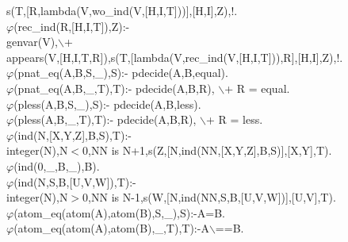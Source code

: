 \documentclass[11pt]{report}
\begin{document}
\begin{sf}
\begin{tabbing}
\hspace{2em}s(T,[R,lambda(V,wo\_\hspace{0.1em}ind(V,[H,I,T]))],[H,I],Z),!.\\[-0.15ex]
$\varphi$(rec\_\hspace{0.1em}ind(R,[H,I,T]),Z):-\\[-0.15ex]
\hspace{2em}genvar(V),$\backslash$+\\[-0.15ex]
\hspace{2em}appears(V,[H,I,T,R]),s(T,[lambda(V,rec\_\hspace{0.1em}ind(V,[H,I,T])),R],[H,I],Z),!.\\[-0.15ex]
$\varphi$(pnat\_\hspace{0.1em}eq(A,B,S,\_\hspace{0.1em}),S):- pdecide(A,B,equal).\\[-0.15ex]
$\varphi$(pnat\_\hspace{0.1em}eq(A,B,\_\hspace{0.1em},T),T):- pdecide(A,B,R), $\backslash$+ R = equal.\\[-0.15ex]
$\varphi$(pless(A,B,S,\_\hspace{0.1em}),S):- pdecide(A,B,less).\\[-0.15ex]
$\varphi$(pless(A,B,\_\hspace{0.1em},T),T):- pdecide(A,B,R), $\backslash$+ R = less.\\[-0.15ex]
$\varphi$(ind(N,[X,Y,Z],B,S),T):- \\[-0.15ex]
\hspace{2em}integer(N),N$<$0,NN is N+1,s(Z,[N,ind(NN,[X,Y,Z],B,S)],[X,Y],T).\\[-0.15ex]
$\varphi$(ind(0,\_\hspace{0.1em},B,\_\hspace{0.1em}),B).\\[-0.15ex]
$\varphi$(ind(N,S,B,[U,V,W]),T):- \\[-0.15ex]
\hspace{2em}integer(N),N$>$0,NN is N-1,s(W,[N,ind(NN,S,B,[U,V,W])],[U,V],T).\\[-0.15ex]
$\varphi$(atom\_\hspace{0.1em}eq(atom(A),atom(B),S,\_\hspace{0.1em}),S):-A=B.\\[-0.15ex]
$\varphi$(atom\_\hspace{0.1em}eq(atom(A),atom(B),\_\hspace{0.1em},T),T):-A$\backslash$==B.\\[-0.15ex]

\end{tabbing}
\end{sf}
\end{document}
